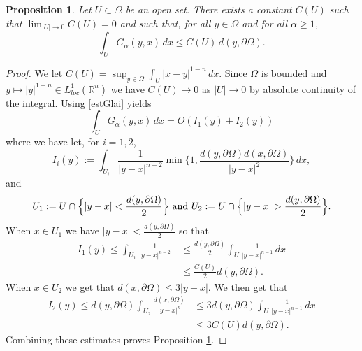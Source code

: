 \documentclass[10pt,a4paper]{amsart}
\newtheorem{prop}{Proposition}
\newcommand{\Om}{\Omega}
\newcommand{\R}{\mathbb{R}}
\def \bb{\hbox}
\begin{document}
\begin{prop}\label{lemme:estu0}
	Let $U \subset \Om$ be an open set. There exists a constant $C(U)$ such that $\lim_{|U| \to 0} C(U) = 0$ and such that, for all $y\in \Om$ and for all $\alpha \ge 1$,
	\begin{equation}\label{eq:estu0}
		\int_{U} G_{\alpha}(y,x)\, dx\leq C(U)\,  d(y,\partial\Om).
	\end{equation}
\end{prop}

\begin{proof}
We let $C(U) = \sup_{y \in \Om} \int_{U} |x-y|^{1-n} \, dx$. Since $\Om$ is bounded and $y \mapsto |y|^{1-n} \in L^{1}_{loc}(\R^n)$ we have $C(U) \to 0$ as $|U| \to 0$ by absolute continuity of the integral. Using \eqref{estGlai} yields
\begin{equation}\label{sumI1+I2}
	\int_{U} G_{\alpha}(y,x)\, dx= 
	O\left(  I_{1}(y)+I_{2}(y)\right) 
\end{equation}
where we have let, for $i=1,2$, 
\begin{equation*}
	I_i(y):= \int_{U_i}\frac{1}{|y-x|^{n-2}} \min\Big\{1,\frac{d(y,\partial\Om)d(x,\partial\Om)}{|y-x|^2}\Big\}\, dx,
\end{equation*}
and
\begin{eqnarray*}
	U_1:=U \cap \Big\{|y-x|<\frac{d(y,\partial\Om)}{2}\Big\} \bb{ and }U_2:=U \cap \Big\{|y-x|>\frac{d(y,\partial\Om)}{2}\Big\}.
\end{eqnarray*}
When $x \in U_1$ we have $|y-x|<\frac{d(y,\partial\Om)}{2}$ so that
\begin{equation*}
\begin{aligned}
I_1(y)\le\int_{U_1}\frac{1}{|y-x|^{n-2}}\, & \le \frac{d(y,\partial\Om)}{2}\int_{U}\frac{1}{|y-x|^{n-1}}\, dx \\
&  \le \frac{C(U)}{2} d(y, \partial \Om). 
\end{aligned}
\end{equation*}
When $x\in U_2$ we get that $d(x,\partial \Om) \leq 3|y-x|$.  We then get that 
\begin{equation*}
\begin{aligned}
I_2(y) \le d(y,\partial\Om)\int_{U_2} \frac{d(x,\partial\Om)}{|y-x|^{n}}
					& \le 3 d(y,\partial\Om) \int_{U}\frac{1}{|y-x|^{n-1}}\, dx \\
					& \le 3 C(U) d(y, \partial \Om). 
\end{aligned}
\end{equation*}
Combining these estimates proves Proposition \ref{lemme:estu0}.\end{proof}
\end{document}
